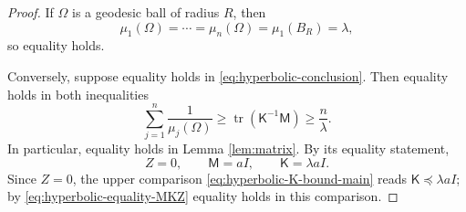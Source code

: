 \documentclass[11pt]{amsart}
\theoremstyle{remark}
\DeclareMathOperator{\tr}{tr}
\newcommand{\Id}{I}
\newcommand{\mcM}{\mathsf M}
\newcommand{\mcK}{\mathsf K}
\begin{document}
\begin{proof}
If $\Omega$ is a geodesic ball of radius $R$, then
$$
        \mu_1(\Omega)=\cdots=\mu_n(\Omega)=\mu_1(B_R)=\lambda,
$$
so equality holds.

Conversely, suppose equality holds in \eqref{eq:hyperbolic-conclusion}.  Then equality holds in both inequalities
$$
        \sum_{j=1}^n\frac1{\mu_j(\Omega)}
        \ge \tr(\mcK^{-1}\mcM)
        \ge \frac{n}{\lambda}.
$$
In particular, equality holds in Lemma \ref{lem:matrix}.  By its equality statement,
\begin{equation}\label{eq:hyperbolic-equality-MKZ}
        Z=0,
        \qquad
        \mcM=a\Id,
        \qquad
        \mcK=\lambda a\Id.
\end{equation}
Since $Z=0$, the upper comparison \eqref{eq:hyperbolic-K-bound-main} reads $\mcK\preceq \lambda a\Id$; by \eqref{eq:hyperbolic-equality-MKZ} equality holds in this comparison.


\end{proof}
\end{document}

